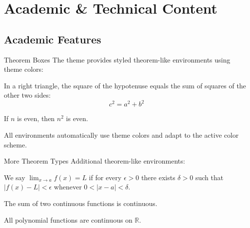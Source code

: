 \documentclass[aspectratio=169]{beamer}
\begin{document}
\section{Academic \& Technical Content}

\subsection{Academic Features}

\begin{frame}{Theorem Boxes}
  The theme provides styled theorem-like environments using theme colors:

  \vspace{0.5em}

  \begin{shibuitheorem}
    In a right triangle, the square of the hypotenuse equals the sum of squares of the other two sides:
    \[c^2 = a^2 + b^2\]
  \end{shibuitheorem}

  \vspace{0.3em}

  \begin{shibuilemma}
    If $n$ is even, then $n^2$ is even.
  \end{shibuilemma}

  \vspace{0.3em}

  All environments automatically use theme colors and adapt to the active color scheme.
\end{frame}

\begin{frame}{More Theorem Types}
  Additional theorem-like environments:

  \vspace{0.5em}

  \begin{shibuidefinition}[Limit]
    We say $\lim_{x \to a} f(x) = L$ if for every $\epsilon > 0$ there exists $\delta > 0$ such that $|f(x) - L| < \epsilon$ whenever $0 < |x - a| < \delta$.
  \end{shibuidefinition}

  \vspace{0.3em}

  \begin{shibuiproposition}
    The sum of two continuous functions is continuous.
  \end{shibuiproposition}

  \vspace{0.3em}

  \begin{shibuicorollary}
    All polynomial functions are continuous on $\mathbb{R}$.
  \end{shibuicorollary}
\end{frame}
\end{document}
